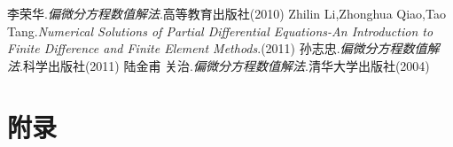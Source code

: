 \documentclass[a4paper,UTF8]{ctexart}
\theoremstyle{plain} \newtheorem{theorem}{定理}[section]
\theoremstyle{plain} \newtheorem{definition}{定义}[section]
\theoremstyle{plain} \newtheorem{lemma}{引理}[section]
\theoremstyle{plain} \newtheorem{proposition}{命题}[section]
\theoremstyle{plain} \newtheorem{example}{例}[section]
\theoremstyle{plain} \newtheorem{remark}{注}[section]
\theoremstyle{plain} \newtheorem{corollary}{推论}[section]
\begin{document}
\begin{thebibliography}{4}
   李荣华.\emph{偏微分方程数值解法}.高等教育出版社(2010) 
   Zhilin Li,Zhonghua Qiao,Tao Tang.\emph{Numerical Solutions of Partial Differential Equations-An Introduction to Finite Difference and Finite Element Methods}.(2011)
   孙志忠.\emph{偏微分方程数值解法}.科学出版社(2011)
   陆金甫 关治.\emph{偏微分方程数值解法}.清华大学出版社(2004)
  
\end{thebibliography}

\newpage

\section*{附录}
\end{document}
